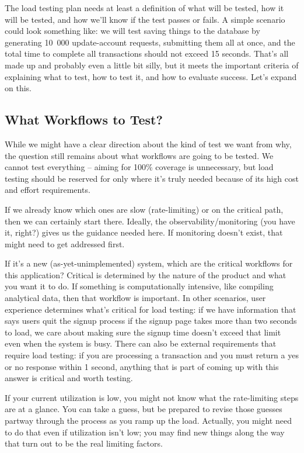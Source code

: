 The load testing plan needs at least a definition of what will be tested, how it will be tested, and how we'll know if the test passes or fails. A simple scenario could look something like: we will test saving things to the database by generating 10~000 update-account requests, submitting them all at once, and the total time to complete all transactions should not exceed 15 seconds. That's all made up and probably even a little bit silly, but it meets the important criteria of explaining what to test, how to test it, and how to evaluate success. Let's expand on this.


\subsection*{What Workflows to Test?}
While we might have a clear direction about the kind of test we want from why, the question still remains about what workflows are going to be tested. We cannot test everything -- aiming for 100\% coverage is unnecessary, but load testing should be reserved for only where it's truly needed because of its high cost and effort requirements.

If we already know which ones are slow (rate-limiting) or on the critical path, then we can certainly start there. Ideally, the observability/monitoring (you have it, right?) gives us the guidance needed here. If monitoring doesn't exist, that might need to get addressed first.

If it's a new (as-yet-unimplemented) system, which are the critical workflows for this application? Critical is determined by the nature of the product and what you want it to do. If something is computationally intensive, like compiling analytical data, then that workflow is important. In other scenarios, user experience determines what's critical for load testing: if we have information that says users quit the signup process if the signup page takes more than two seconds to load, we care about making sure the signup time doesn't exceed that limit even when the system is busy. There can also be external requirements that require load testing: if you are processing a transaction and you must return a yes or no response within 1 second, anything that is part of coming up with this answer is critical and worth testing.

If your current utilization is low, you might not know what the rate-limiting steps are at a glance. You can take a guess, but be prepared to revise those guesses partway through the process as you ramp up the load. Actually, you might need to do that even if utilization isn't low; you may find new things along the way that turn out to be the real limiting factors. 

